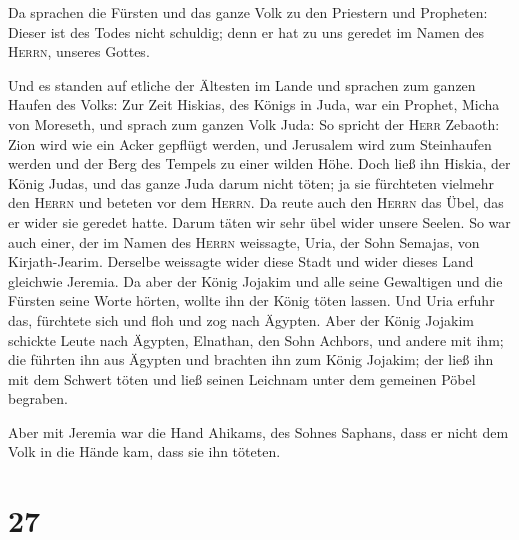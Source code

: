 Da sprachen die Fürsten und das ganze Volk zu den
Priestern und Propheten: Dieser ist des Todes nicht schuldig; denn er
hat zu uns geredet im Namen des \textsc{Herrn}, unseres Gottes.

 Und es standen auf etliche der Ältesten im Lande und
sprachen zum ganzen Haufen des Volks:  Zur Zeit Hiskias,
des Königs in Juda, war ein Prophet, Micha von Moreseth, und sprach zum
ganzen Volk Juda: So spricht der \textsc{Herr} Zebaoth: Zion wird wie
ein Acker gepflügt werden, und Jerusalem wird zum Steinhaufen werden und
der Berg des Tempels zu einer wilden Höhe.  Doch ließ ihn
Hiskia, der König Judas, und das ganze Juda darum nicht töten; ja sie
fürchteten vielmehr den \textsc{Herrn} und beteten vor dem
\textsc{Herrn}. Da reute auch den \textsc{Herrn} das Übel, das er wider
sie geredet hatte. Darum täten wir sehr übel wider unsere Seelen.
 So war auch einer, der im Namen des \textsc{Herrn}
weissagte, Uria, der Sohn Semajas, von Kirjath-Jearim. Derselbe
weissagte wider diese Stadt und wider dieses Land gleichwie Jeremia.
 Da aber der König Jojakim und alle seine Gewaltigen und
die Fürsten seine Worte hörten, wollte ihn der König töten lassen. Und
Uria erfuhr das, fürchtete sich und floh und zog nach Ägypten.
 Aber der König Jojakim schickte Leute nach Ägypten,
Elnathan, den Sohn Achbors, und andere mit ihm;  die
führten ihn aus Ägypten und brachten ihn zum König Jojakim; der ließ ihn
mit dem Schwert töten und ließ seinen Leichnam unter dem gemeinen Pöbel
begraben.

 Aber mit Jeremia war die Hand Ahikams, des Sohnes
Saphans, dass er nicht dem Volk in die Hände kam, dass sie ihn töteten.

\hypertarget{section-26}{%
\section{27}\label{section-26}}

